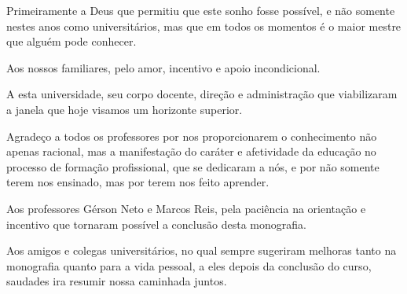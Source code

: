 Primeiramente a Deus que permitiu que este sonho fosse possível, e não somente nestes anos como universitários, mas que em todos os momentos é o maior mestre que alguém pode conhecer.
	
Aos nossos familiares, pelo amor, incentivo e apoio incondicional.

A esta universidade, seu corpo docente, direção e administração que viabilizaram a janela que hoje visamos um horizonte superior.

Agradeço a todos os professores por nos proporcionarem o conhecimento não apenas racional, mas a manifestação do caráter e afetividade da educação no processo de formação profissional, que se dedicaram a nós, e por não somente terem nos ensinado, mas por terem nos feito aprender.

Aos professores Gérson Neto e Marcos Reis, pela paciência na orientação e incentivo que tornaram possível a conclusão desta monografia. 

Aos amigos e colegas universitários, no qual sempre sugeriram melhoras tanto na monografia quanto para a vida pessoal, a eles depois da conclusão do curso, saudades ira resumir nossa caminhada juntos. 